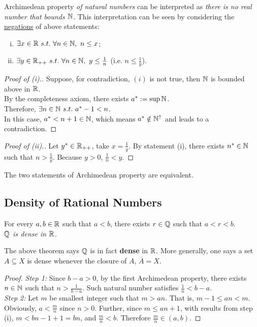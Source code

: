 \documentclass[11pt]{article}
\begin{document}
	Archimedean property \emph{of natural numbers} can be interpreted as \emph{there is no real number that bounds $\mathbb{N}$}. This interpretation can be seen by considering the \ul{negations} of above statements:
	\begin{enumerate}[(i)]
		\item $\exists x \in \mathbb{R}\ s.t.\ \forall n \in \mathbb{N},\ n \leq x$;
		\item $\exists y \in \mathbb{R}_{++}\ s.t.\ \forall n \in \mathbb{N},\ y \leq \frac{1}{n}$ (i.e. $n \leq \frac{1}{y}$).
	\end{enumerate}
	
	\begin{proof}[Proof of (i).]
		Suppose, for contradiction, $(i)$ is not true, then $\mathbb{N}$ is bounded above in $\mathbb{R}$. \\
		By the completeness axiom, there exists $a^* := \sup \mathbb{N}$.\\
		Therefore, $\exists n \in \mathbb{N}\ s.t.\ a^* - 1< n$.\\
		In this case, $a^* < n + 1 \in \mathbb{N}$, which means $a^* \notin \mathbb{N}^\uparrow$ and leads to a contradiction.
	\end{proof}
	
	\begin{proof}[Proof of (ii).]
		Let $y^* \in \mathbb{R}_{++}$, take $x = \frac{1}{y}$. By statement (i), there exists $n^* \in \mathbb{N}$ such that $n >	\frac{1}{y}$. Because $y > 0$, $\frac{1}{n} < y$.
	\end{proof}
	
	\begin{remark}
		The two statements of Archimedean property are equivalent.
	\end{remark}
	
	\subsection{Density of Rational Numbers}
	\begin{theorem}
		For every $a, b \in \mathbb{R}$ such that $a < b$, there exists $r \in \mathbb{Q}$ such that $a < r < b$. \\
		\emph{$\mathbb{Q}$ is dense in $\mathbb{R}$.}
	\end{theorem}
	
	\begin{remark}
		The above theorem says $\mathbb{Q}$ is in fact \textbf{dense} in $\mathbb{R}$. More generally, one says a set $A \subseteq X$ is dense whenever the closure of $A$, $\overline{A} = X$.
	\end{remark}
	
	\begin{proof}
		\emph{Step 1:} Since $b - a > 0$, by the first Archimedean property, there exists $n \in \mathbb{N}$ such that $n > \frac{1}{b - a}$. Such natural number satisfies $\frac{1}{n} < b - a$.\\
		\emph{Step 2:} Let $m$ be smallest integer such that $m > an$. That is, $m - 1 \leq an < m$. Obviously, $a < \frac{m}{n}$ since $n > 0$. Further, since $m \leq an + 1$, with results from step (i), $m < bn - 1 + 1 = bn$, and $\frac{m}{n} < b$. Therefore $\frac{m}{n} \in (a, b)$.
	\end{proof}
	
\end{document}
